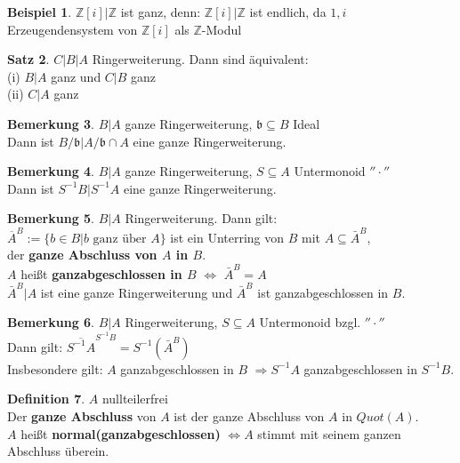 \documentclass[10pt,a4paper,numbers=endperiod]{scrreprt}
\theoremstyle{definition}
\newtheorem{satz}{Satz}[section]
\newtheorem{defi}[satz]{Definition}
\newtheorem{bem}[satz]{Bemerkung}
\newtheorem{bsp}[satz]{Beispiel}
\def\ZZ{{\mathbb Z}}
\begin{document}
\begin{bsp}
	$\ZZ[i]|\ZZ$ ist ganz, denn: $\ZZ[i]|\ZZ$ ist endlich, da $1, i$ Erzeugendensystem von $\ZZ[i]$ als $\ZZ$-Modul
\end{bsp}

\begin{satz}
	$C|B|A$ Ringerweiterung. Dann sind äquivalent:\\
	(i) $B|A$ ganz und $C|B$ ganz\\
	(ii) $C|A$ ganz
\end{satz}

\begin{bem}
	$B|A$ ganze Ringerweiterung, $\mathfrak{b} \subseteq B$ Ideal\\
	Dann ist $B/\mathfrak{b} | A/\mathfrak{b} \cap A$ eine ganze Ringerweiterung.
\end{bem}

\begin{bem}
	$B|A$ ganze Ringerweiterung, $S \subseteq A$ Untermonoid $''\cdot''$\\
	Dann ist $S^{-1}B|S^{-1}A$ eine ganze Ringerweiterung.
\end{bem}

\begin{bem}
	$B|A$ Ringerweiterung. Dann gilt:\\
	$\overline{A}^B := \{b \in B| b \text{ ganz über } A\}$ ist ein Unterring von $B$ mit $A \subseteq \bar{A}^B$,\\
	der \textbf{ganze Abschluss von $A$ in $B$}.\\
	$A$ heißt \textbf{ganzabgeschlossen in $B$} $\Leftrightarrow$ $\bar{A}^B = A$\\
	$\bar{A}^B|A$ ist eine ganze Ringerweiterung und $\bar{A}^B$ ist ganzabgeschlossen in $B$.
\end{bem}

\begin{bem}
	$B|A$ Ringerweiterung, $S \subseteq A$ Untermonoid bzgl. $''\cdot''$\\
	Dann gilt: $\overline{S^{-1}A}^{S^{-1}B} = S^{-1}(\bar{A}^B)$\\
	Insbesondere gilt: $A$ ganzabgeschlossen in $B$ $\Rightarrow S^{-1}A$ ganzabgeschlossen in $S^{-1}B$.
\end{bem}

\begin{defi}
	$A$ nullteilerfrei\\
	Der \textbf{ganze Abschluss} von $A$ ist der ganze Abschluss von $A$ in $Quot(A)$.\\
	$A$ heißt \textbf{normal(ganzabgeschlossen)} $\Leftrightarrow A$ stimmt mit seinem ganzen Abschluss überein.
\end{defi}
\end{document}
